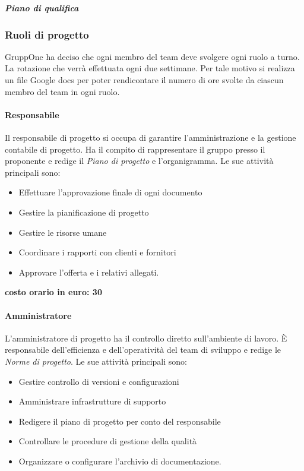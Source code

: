 \documentclass[../norme-di-progetto.tex]{subfiles}
\begin{document}
\subparagraph{Piano di qualifica}%
\label{subp:piano_di_qualifica}

\subsubsection{Ruoli di progetto}%
\label{subs:ruoli_di_progetto}

GruppOne ha deciso che ogni membro del team deve svolgere ogni ruolo a turno.
La rotazione che verrà effettuata ogni due settimane.
Per tale motivo si realizza un file Google docs per poter rendicontare il numero di ore svolte da ciascun membro del team in ogni ruolo.

\paragraph{Responsabile}%
\label{par:responsabile}
Il responsabile di progetto si occupa di garantire l'amministrazione e la gestione contabile di progetto.
Ha il compito di rappresentare il gruppo presso il proponente e redige il \textit{Piano di progetto} e l'organigramma.
Le sue attività principali sono:

\begin{itemize}
  \item Effettuare l'approvazione finale di ogni documento
  \item Gestire la pianificazione di progetto
  \item Gestire le risorse umane
  \item Coordinare i rapporti con clienti e fornitori
  \item Approvare l'offerta e i relativi allegati.
\end{itemize}

\textbf{costo orario in euro: 30}

\paragraph{Amministratore}%
\label{par:amministratore}
L'amministratore di progetto ha il controllo diretto sull'ambiente di lavoro. È responsabile dell'efficienza e dell'operatività del team di sviluppo e redige le \textit{Norme di progetto}. Le sue attività principali sono:

\begin{itemize}
  \item Gestire controllo di versioni e configurazioni
  \item Amministrare infrastrutture di supporto
  \item Redigere il piano di progetto per conto del responsabile
  \item Controllare le procedure di gestione della qualità
  \item Organizzare o configurare l'archivio di documentazione.
\end{itemize}
\end{document}
